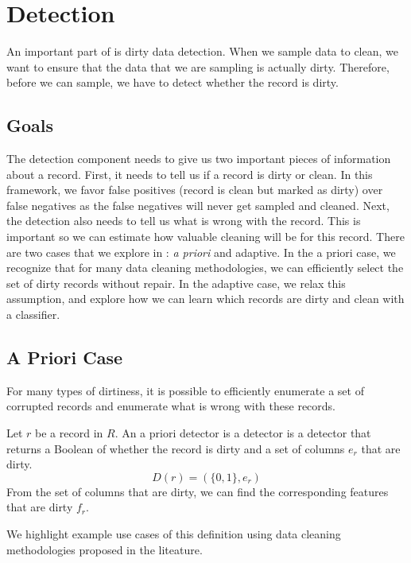 \section{Detection}\label{det}
An important part of \sys is dirty data detection.
When we sample data to clean, we want to ensure that the data that we are sampling is actually dirty.
Therefore, before we can sample, we have to detect whether the record is dirty.

\subsection{Goals}
The detection component needs to give us two important pieces of information about a record.
First, it needs to tell us if a record is dirty or clean.
In this framework, we favor false positives (record is clean but marked as dirty) over false negatives as the false negatives will never get sampled and cleaned.
Next, the detection also needs to tell us what is wrong with the record.
This is important so we can estimate how valuable cleaning will be for this record.
There are two cases that we explore in \sys: \emph{a priori} and adaptive.
In the a priori case, we recognize that for many data cleaning methodologies, we can efficiently select the set of dirty records without repair.
In the adaptive case, we relax this assumption, and explore how we can learn which records are dirty and clean with a classifier.

\subsection{A Priori Case}
For many types of dirtiness, it is possible to efficiently enumerate a set of corrupted records and enumerate what is wrong with these records.

\begin{definition}
Let $r$ be a record in $R$. An a priori detector is a detector is a detector that returns a Boolean of whether the record is dirty and a set of columns $e_r$ that are dirty.
\[
D(r) = (\{0,1\}, e_r)
\]
From the set of columns that are dirty, we can find the corresponding features that are dirty $f_r$.
\end{definition}

\noindent We highlight example use cases of this definition using data cleaning methodologies proposed in the liteature.

\vspace{0.5em}

